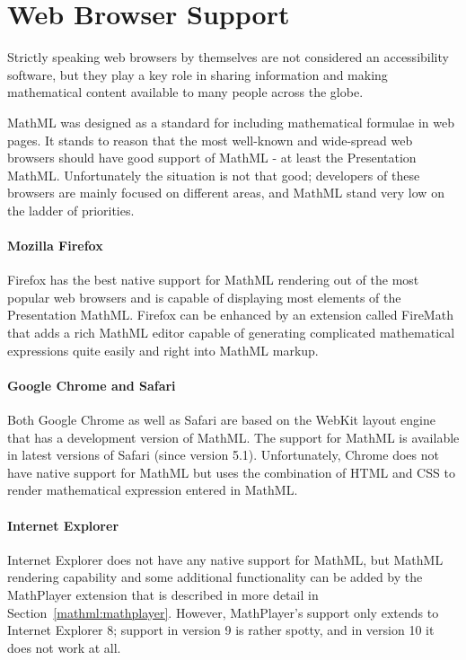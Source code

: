 \documentclass[11pt,oneside,final]{fithesis2}
\begin{document}
\section{Web Browser Support}
Strictly speaking web browsers by themselves are not considered an accessibility software, but they play a key role in sharing information and making mathematical content available to many people across the globe.

MathML was designed as a standard for including mathematical formulae in web pages. It stands to reason that the most well-known and wide-spread web browsers should have good support of MathML - at least the Presentation MathML. Unfortunately the situation is not that good; developers of these browsers are mainly focused on different areas, and MathML stand very low on the ladder of priorities.

\paragraph*{Mozilla Firefox} 
Firefox has the best native support for MathML rendering out of the most popular web browsers and is capable of displaying most elements of the Presentation MathML. Firefox can be enhanced by an extension called FireMath that adds a rich MathML editor capable of generating complicated mathematical expressions quite easily and right into MathML markup.

\paragraph*{Google Chrome and Safari}
Both Google Chrome as well as Safari are based on the WebKit layout engine that has a development version of MathML. The support for MathML is available in latest versions of Safari (since version 5.1). Unfortunately, Chrome does not have native support for MathML but uses the combination of HTML and CSS to render mathematical expression entered in MathML.

\paragraph*{Internet Explorer}
Internet Explorer does not have any native support for MathML, but MathML rendering capability and some additional functionality can be added by the MathPlayer extension that is described in more detail in Section~\ref{mathml:mathplayer}. However, MathPlayer's support only extends to Internet Explorer 8; support in version 9 is rather spotty, and in version 10 it does not work at all.
\end{document}
